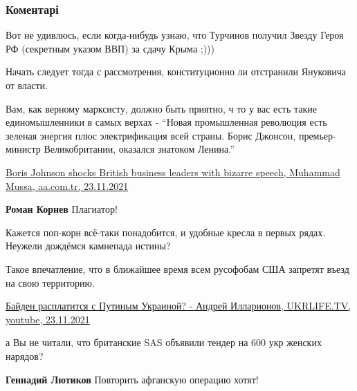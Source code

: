  
 
 
 
 
\subsubsection{Коментарі}

\begin{itemize} %
Вот не удивлюсь, если когда-нибудь узнаю, что Турчинов получил Звезду Героя РФ (секретным указом ВВП) за сдачу Крыма ;)))

Начать следует тогда с рассмотрения, конституционно ли отстранили Януковича от власти.


Вам, как верному марксисту, должно быть приятно, ч то у вас есть такие
единомышленники в самых верхах - \enquote{Новая промышленная революция есть зеленая
энергия плюс электрификация всей страны. Борис Джонсон, премьер-министр
Великобритании, оказался знатоком Ленина.}

\href{https://www.aa.com.tr/en/europe/boris-johnson-shocks-british-business-leaders-with-bizarre-speech/2427877}{%
Boris Johnson shocks British business leaders with bizarre speech, Muhammad Mussa, aa.com.tr, 23.11.2021%
}

\textbf{Роман Корнев} Плагиатор!


Кажется поп-корн всё-таки понадобится, и удобные кресла в первых рядах. Неужели
дождёмся камнепада истины?


Такое впечатление, что в ближайшее время всем русофобам США запретят въезд на
свою территорию.

\href{https://youtu.be/n7yA-PgLppk}{%
Байден расплатится с Путиным Украиной? - Андрей Илларионов, UKRLIFE.TV, youtube, 23.11.2021%
}


а Вы не читали, что британские SAS объявили тендер на 600 укр женских нарядов?


\begin{itemize} %
\textbf{Геннадий Лютиков} Повторить афганскую операцию хотят!


\end{itemize}
\end{itemize}
